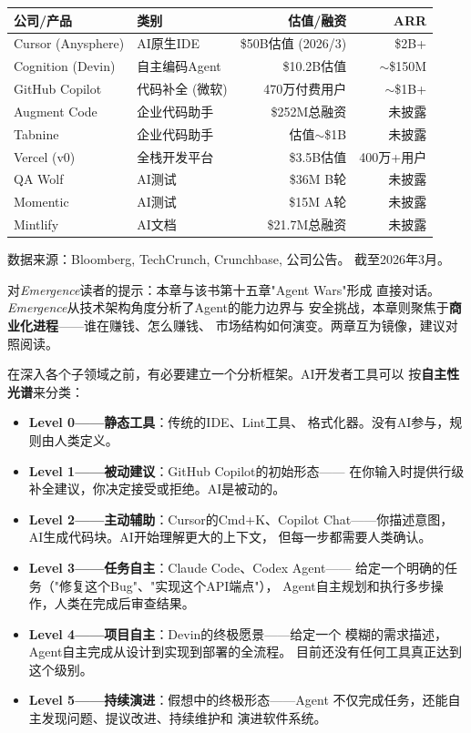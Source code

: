 \begin{keybox}
\small
\begin{tabularx}{\textwidth}{l X r r}
\toprule
\rowcolor{figLightGray}
\textbf{公司/产品} & \textbf{类别} & \textbf{估值/融资} & \textbf{ARR} \\
\midrule
Cursor (Anysphere) & AI原生IDE        & \$50B估值 (2026/3)  & \$2B+ \\
Cognition (Devin)  & 自主编码Agent     & \$10.2B估值         & $\sim$\$150M \\
GitHub Copilot     & 代码补全 (微软)   & 470万付费用户       & $\sim$\$1B+ \\
Augment Code       & 企业代码助手      & \$252M总融资        & 未披露 \\
Tabnine            & 企业代码助手      & 估值$\sim$\$1B      & 未披露 \\
Vercel (v0)        & 全栈开发平台      & \$3.5B估值          & 400万+用户 \\
QA Wolf            & AI测试            & \$36M B轮           & 未披露 \\
Momentic           & AI测试            & \$15M A轮           & 未披露 \\
Mintlify           & AI文档            & \$21.7M总融资       & 未披露 \\
\bottomrule
\end{tabularx}

\medskip
\noindent 数据来源：Bloomberg, TechCrunch, Crunchbase, 公司公告。
截至2026年3月。
\end{keybox}

对\textit{Emergence}读者的提示：本章与该书第十五章"Agent Wars"形成
直接对话。\textit{Emergence}从技术架构角度分析了Agent的能力边界与
安全挑战，本章则聚焦于\textbf{商业化进程}——谁在赚钱、怎么赚钱、
市场结构如何演变。两章互为镜像，建议对照阅读。

在深入各个子领域之前，有必要建立一个分析框架。AI开发者工具可以
按\textbf{自主性光谱}来分类：

\begin{itemize}
  \item \textbf{Level 0——静态工具}：传统的IDE、Lint工具、
    格式化器。没有AI参与，规则由人类定义。
  \item \textbf{Level 1——被动建议}：GitHub Copilot的初始形态——
    在你输入时提供行级补全建议，你决定接受或拒绝。AI是被动的。
  \item \textbf{Level 2——主动辅助}：Cursor的Cmd+K、Copilot
    Chat——你描述意图，AI生成代码块。AI开始理解更大的上下文，
    但每一步都需要人类确认。
  \item \textbf{Level 3——任务自主}：Claude Code、Codex Agent——
    给定一个明确的任务（"修复这个Bug"、"实现这个API端点"），
    Agent自主规划和执行多步操作，人类在完成后审查结果。
  \item \textbf{Level 4——项目自主}：Devin的终极愿景——给定一个
    模糊的需求描述，Agent自主完成从设计到实现到部署的全流程。
    目前还没有任何工具真正达到这个级别。
  \item \textbf{Level 5——持续演进}：假想中的终极形态——Agent
    不仅完成任务，还能自主发现问题、提议改进、持续维护和
    演进软件系统。
\end{itemize}

